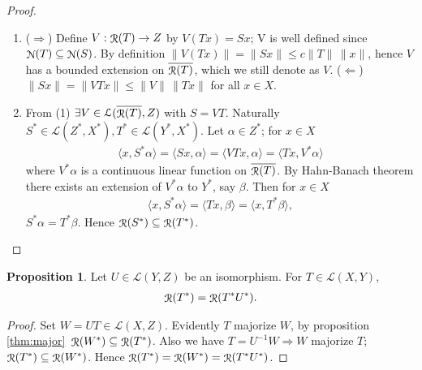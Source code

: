 \documentclass[a4paper,12pt]{article}
\theoremstyle{definition}
\newtheorem{prp}{Proposition}
\DeclareMathOperator\img{\EuScript{R}}
\DeclareMathOperator\nul{\EuScript{N}}
\begin{document}
\begin{proof}
  \begin{enumerate}
    \item ($\Longrightarrow$) Define $V:\img(T)\to Z$ by $V(Tx)=Sx$; V is well defined since $\nul(T)\subseteq\nul(S)$. By definition $\|V(Tx)\|=\|Sx\|\leqslant c\|T\|\,\|x\|$, hence $V$ has a bounded extension on $\overline{\img(T)}$, which we still denote as $V$. ($\Longleftarrow$) $\|Sx\|=\|VTx\|\leqslant\|V\|\,\|Tx\|$ for all $x\in X$.
    \item From (1) $\exists V\in\mathcal{L}(\overline{\img(T)}, Z)$ with $S=VT$. Naturally $S^*\in\mathcal{L}(Z^*, X^*), T^*\in\mathcal{L}(Y^*, X^*)$. Let $\alpha\in Z^*$; for $x\in X$ 
      \begin{align*}
        \langle x, S^*\alpha\rangle=\langle Sx,\alpha\rangle=\langle VTx,\alpha\rangle=\langle Tx, V^*\alpha\rangle
      \end{align*}
      where $V^*\alpha$ is a continuous linear function on $\overline{\img(T)}$. By Hahn-Banach theorem there exists an extension of $V^*\alpha$ to $Y^*$, say $\beta$. Then for $x\in X$
      \begin{align*}
        \langle x, S^*\alpha\rangle=\langle Tx,\beta\rangle=\langle x, T^*\beta\rangle,
      \end{align*}
$S^*\alpha=T^*\beta$. Hence $\img(S^*)\subseteq\img(T^*)$.
  \end{enumerate}
\end{proof}


\begin{prp}
  Let $U\in\mathcal{L}(Y, Z)$ be an isomorphism. For $T\in\mathcal{L}(X, Y)$,
  \begin{align*}
    \img(T^*) = \img(T^*U^*).
  \end{align*}
\end{prp}

\begin{proof}
  Set $W= UT\in\mathcal{L}(X, Z)$. Evidently $T$ majorize $W$, by proposition \ref{thm:major}\, $\img(W^*)\subseteq\img(T^*)$. Also we have $T=U^{-1}W\Longrightarrow W$ majorize $T$; $\img(T^*)\subseteq\img(W^*)$. Hence $\img(T^*)=\img(W^*)=\img(T^*U^*)$.    
\end{proof}
\end{document}
